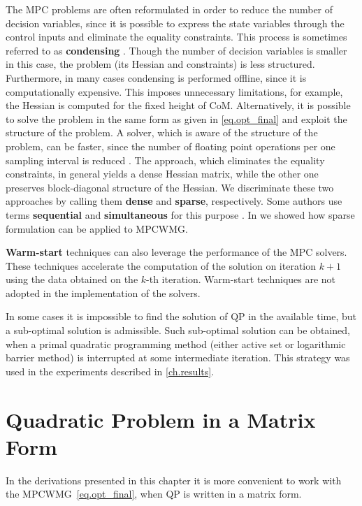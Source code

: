 The \ac{MPC} problems are often reformulated in order to reduce the number of 
decision variables, since it is possible to express the state variables through 
the control inputs and eliminate the equality constraints. This process is sometimes
referred to as {\bf condensing} \cite{FerreauASWarm, BockMultShooting}. Though the 
number of decision variables is smaller in this case, the problem (its Hessian and 
constraints) is less structured. Furthermore, in many cases condensing is performed
offline, since it is computationally expensive. This imposes unnecessary limitations,
for example, the Hessian is computed for the fixed height of \ac{CoM}. Alternatively, 
it is possible to solve the problem in the same form as given in \cref{eq.opt_final} 
and exploit the structure of the problem. A solver, which is aware of the structure 
of the problem, can be faster, since the number of floating point operations per one 
sampling interval is reduced \cite{FastMPC, dimitrov2011sparse, RaoIPMPC}. The 
approach, which eliminates the equality constraints, in general yields a dense 
Hessian matrix, while the other one preserves block-diagonal structure of the 
Hessian. We discriminate these two approaches by calling them {\bf dense} and 
{\bf sparse}, respectively. Some authors use terms {\bf sequential} and 
{\bf simultaneous} for this purpose \cite{DiehlNMPC}. In \cite{dimitrov2011sparse} 
we showed how sparse formulation can be applied to \ac{MPCWMG}.

{\bf Warm-start} techniques can also leverage the performance of the \ac{MPC} solvers.
These techniques accelerate the computation of the solution on iteration $k+1$ using 
the data obtained on the $k$-th iteration. Warm-start techniques are not adopted in
the implementation of the solvers.

In some cases it is impossible to find the solution of \ac{QP} in the available
time, but a sub-optimal solution is admissible. Such sub-optimal solution can be
obtained, when a primal quadratic programming method (either active set or logarithmic
barrier method) is interrupted at some intermediate iteration. This strategy was used 
in the experiments described in \cref{ch.results}.



\section{Quadratic Problem in a Matrix Form}
In the derivations presented in this chapter it is more convenient to work with 
the \ac{MPCWMG}~\eqref{eq.opt_final}, when \ac{QP} is written in a matrix form. 

